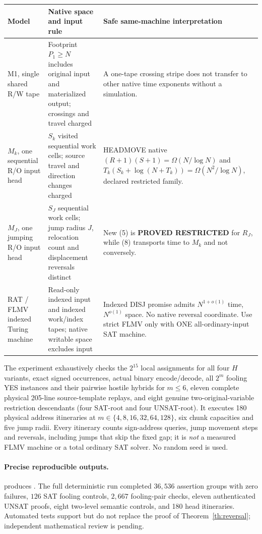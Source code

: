 \documentclass[11pt]{article}
\begin{document}
\begin{center}\small
\begin{tabularx}{\linewidth}{p{.13\linewidth}p{.30\linewidth}X}
\toprule
Model & Native space and input rule & Safe same-machine interpretation\\\midrule
M1, single shared R/W tape & Footprint $P_1\ge N$ includes original input and materialized output; crossings and travel charged & A one-tape crossing stripe does not transfer to other native time exponents without a simulation.\\
$M_k$, one sequential R/O input head & $S_k$ visited sequential work cells; source travel and direction changes charged & HEADMOVE native $(R+1)(S+1)=\Omega(N/\log N)$ and $T_k(S_k+\log(N+T_k))=\Omega(N^2/\log N)$, declared restricted family.\\
$M_J$, one jumping R/O input head & $S_J$ sequential work cells; jump radius $J$, relocation count and displacement reversals distinct & New (5) is \textbf{PROVED RESTRICTED} for $R_J$, while (8) transports time to $M_k$ and not conversely.\\
RAT / FLMV indexed Turing machine & Read-only indexed input and indexed work/index tapes; native writable space excludes input & Indexed DISJ promise admits $N^{1+o(1)}$ time, $N^{o(1)}$ space. No native reversal coordinate. Use strict FLMV only with ONE all-ordinary-input SAT machine.\\\bottomrule
\end{tabularx}
\end{center}

The experiment exhaustively checks the $2^{15}$ local assignments for all four $H$ variants, exact signed occurrences, actual binary encode/decode, all $2^m$ fooling YES instances and their pairwise hostile hybrids for $m\le6$, eleven complete physical 205-line source-template replays, and eight genuine two-original-variable restriction descendants (four SAT-root and four UNSAT-root). It executes 180 physical address itineraries at $m\in\{4,8,16,32,64,128\}$, six chunk capacities and five jump radii. Every itinerary counts sign-address queries, jump movement steps and reversals, including jumps that skip the fixed gap; it is \emph{not} a measured FLMV machine or a total ordinary SAT solver. No random seed is used.

\paragraph{Precise reproducible outputs.}
 produces . The full deterministic run completed $36{,}536$ assertion groups with zero failures, $126$ SAT fooling controls, $2{,}667$ fooling-pair checks, eleven authenticated UNSAT proofs, eight two-level semantic controls, and 180 head itineraries. Automated tests support but do not replace the proof of Theorem~\ref{th:reversal}; independent mathematical review is pending.
\end{document}
